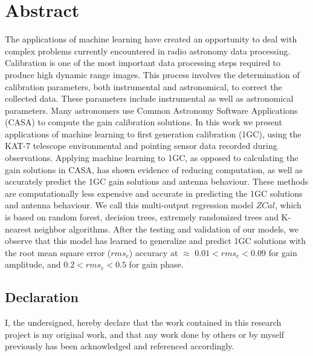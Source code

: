 \chapter*{Abstract} 


The applications of machine learning have created an opportunity to deal with complex problems currently encountered in radio astronomy data processing. Calibration is one of the most important data processing steps required to produce high dynamic range images. This process involves the determination of calibration parameters, both instrumental and astronomical, to correct the
collected data. These parameters include instrumental as well as astronomical parameters. Many astronomers use Common Astronomy Software Applications (CASA) to compute the gain calibration solutions. In this work we present applications of machine learning to first generation calibration (1GC), using the KAT-7 telescope environmental and pointing sensor data recorded during observations. Applying machine learning to 1GC, as opposed to calculating the gain solutions in CASA, has shown evidence of reducing computation, as well as accurately predict the 1GC gain solutions and antenna behaviour. These methods are computationally less expensive and accurate in predicting the 1GC solutions and antenna behaviour. We call this multi-output regression model $\textit{ZCal}$, which is based on random forest, decision trees, extremely randomized trees and K-nearest neighbor algorithms. After the testing and validation of our models, we observe that this model has learned to generalize and predict 1GC solutions with the root mean square error ($rms_{e}$) accuracy at $\approx$ $0.01< rms_{e} <0.09$ for gain amplitude, and $0.2< rms_{e}<0.5$ for gain phase.  


\vfill
\newpage
\section*{Declaration}
I, the undersigned, hereby declare that the work contained in this research project is my original work, and that any work done by others or by myself previously has been acknowledged and referenced accordingly.

